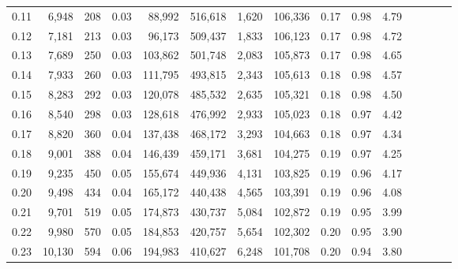 \begin{tabular}{rrrcrrrrrrrrrrr}
0.11 &   6,948 &    208 &                                       0.03 &   88,992 &  516,618 &    1,620 &  106,336 &  0.17 &  0.98 &                         4.79 \\
0.12 &   7,181 &    213 &                                       0.03 &   96,173 &  509,437 &    1,833 &  106,123 &  0.17 &  0.98 &                         4.72 \\
0.13 &   7,689 &    250 &                                       0.03 &  103,862 &  501,748 &    2,083 &  105,873 &  0.17 &  0.98 &                         4.65 \\
0.14 &   7,933 &    260 &                                       0.03 &  111,795 &  493,815 &    2,343 &  105,613 &  0.18 &  0.98 &                         4.57 \\
0.15 &   8,283 &    292 &                                       0.03 &  120,078 &  485,532 &    2,635 &  105,321 &  0.18 &  0.98 &                         4.50 \\
0.16 &   8,540 &    298 &                                       0.03 &  128,618 &  476,992 &    2,933 &  105,023 &  0.18 &  0.97 &                         4.42 \\
0.17 &   8,820 &    360 &                                       0.04 &  137,438 &  468,172 &    3,293 &  104,663 &  0.18 &  0.97 &                         4.34 \\
0.18 &   9,001 &    388 &                                       0.04 &  146,439 &  459,171 &    3,681 &  104,275 &  0.19 &  0.97 &                         4.25 \\
0.19 &   9,235 &    450 &                                       0.05 &  155,674 &  449,936 &    4,131 &  103,825 &  0.19 &  0.96 &                         4.17 \\
0.20 &   9,498 &    434 &                                       0.04 &  165,172 &  440,438 &    4,565 &  103,391 &  0.19 &  0.96 &                         4.08 \\
0.21 &   9,701 &    519 &                                       0.05 &  174,873 &  430,737 &    5,084 &  102,872 &  0.19 &  0.95 &                         3.99 \\
0.22 &   9,980 &    570 &                                       0.05 &  184,853 &  420,757 &    5,654 &  102,302 &  0.20 &  0.95 &                         3.90 \\
0.23 &  10,130 &    594 &                                       0.06 &  194,983 &  410,627 &    6,248 &  101,708 &  0.20 &  0.94 &                         3.80 \\

\end{tabular}
